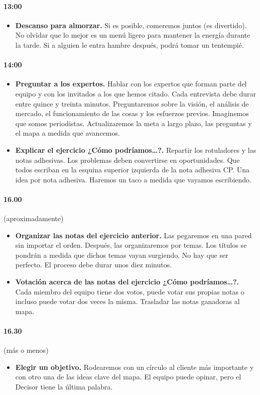 \documentclass[10pt]{article}
\begin{document}
\begin{multicols}{2}
\paragraph{13:00}
\begin{itemize}
\item \textbf{Descanso para almorzar.} Si es posible, comeremos juntos (es divertido). No olvidar que lo mejor es un menú ligero para mantener la energía durante la tarde. Si a alguien le entra hambre después, podrá tomar un tentempié.
\end{itemize}
\paragraph{14:00}
\begin{itemize}
\item \textbf{Preguntar a los expertos.} Hablar con los expertos que forman parte del equipo y con los invitados a los que hemos citado. Cada entrevista debe durar entre quince y treinta minutos. Preguntaremos sobre la visión, el análisis de mercado, el funcionamiento de las cosas y los esfuerzos previos. Imaginemos que somos periodistas. Actualizaremos la meta a largo plazo, las preguntas y el mapa a medida que avancemos.
\item \textbf{Explicar el ejercicio ¿Cómo podríamos…?.} Repartir los rotuladores y las notas adhesivas. Los problemas deben convertirse en oportunidades. Que todos escriban en la esquina superior izquierda de la nota adhesiva CP. Una idea por nota adhesiva. Haremos un taco a medida que vayamos escribiendo.
\end{itemize}
\paragraph{16.00}(aproximadamente)
\begin{itemize}
\item \textbf{Organizar las notas del ejercicio anterior.} Las pegaremos en una pared sin importar el orden. Después, las organizaremos por temas. Los títulos se pondrán a medida que dichos temas vayan surgiendo. No hay que ser perfecto. El proceso debe durar unos diez minutos.
\item \textbf{Votación acerca de las notas del ejercicio ¿Cómo
podríamos…?.} Cada miembro del equipo tiene dos votos, puede votar sus propias notas o incluso puede votar dos veces la misma. Trasladar las notas ganadoras al mapa.
\end{itemize}
\paragraph{16.30}(más o menos)
\begin{itemize}
\item \textbf{Elegir un objetivo.} Rodearemos con un círculo al cliente más importante y con otro una de las ideas clave del mapa. El equipo puede opinar, pero el Decisor tiene la última palabra. 
\end{itemize}

\end{multicols}
\end{document}
